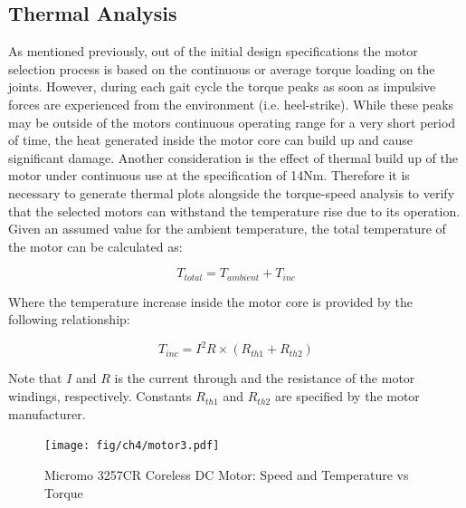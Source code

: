 \subsection{Thermal Analysis} %
\label{sub:thermal_analysis}
As mentioned previously, out of the initial design specifications the motor selection process is based on the continuous or average torque loading on the joints. However, during each gait cycle the torque peaks as soon as impulsive forces are experienced from the environment (i.e. heel-strike). While these peaks may be outside of the motors continuous operating range for a very short period of time, the heat generated inside the motor core can build up and cause significant damage. Another consideration is the effect of thermal build up of the motor under continuous use at the specification of 14Nm. Therefore it is necessary to generate thermal plots alongside the torque-speed analysis to verify that the selected motors can withstand the temperature rise due to its operation. Given an assumed value for the ambient temperature, the total temperature of the motor can be calculated as: 

\begin{equation}
	T_{total} = T_{ambient} + T_{inc}
\end{equation}

Where the temperature increase inside the motor core is provided by the following relationship: 

\begin{equation}
	T_{inc} = I^{2}R \times (R_{th1} + R_{th2})
\end{equation}

Note that $I$ and $R$ is the current through and the resistance of the motor windings, respectively. Constants $R_{th1}$ and $R_{th2}$ are specified by the motor manufacturer. 


\begin{figure}[!ht]
	\begin{center}
    \texttt{[image: fig/ch4/motor3.pdf]}
	\end{center}
  \caption{Micromo 3257CR Coreless DC Motor: Speed and Temperature vs Torque}
\end{figure}

